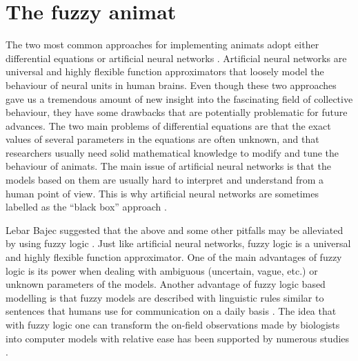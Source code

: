\section{The fuzzy animat}

The two most common approaches for implementing animats adopt either differential equations \cite{couzin2002collective,hildenbrandt2010selforganized,reynolds1987flocks,vicsek2012collective} or artificial neural networks \cite{kunz2006prey,witkowski2016emergence,zaera1996not}. Artificial neural networks \cite{mcculloch1943logical} are universal and highly flexible function approximators that loosely model the behaviour of neural units in human brains. Even though these two approaches gave us a tremendous amount of new insight into the fascinating field of collective behaviour, they have some drawbacks that are potentially problematic for future advances. The two main problems of differential equations are that the exact values of several parameters in the equations are often unknown, and that researchers usually need solid mathematical knowledge to modify and tune the behaviour of animats. The main issue of artificial neural networks is that the models based on them are usually hard to interpret and understand from a human point of view. This is why artificial neural networks are sometimes labelled as the ``black box'' approach \cite{paruelo1997prediction,lek1999artificial,ozesmi1999artificial}.

Lebar Bajec\etal \cite{lebarbajec2005fuzzy,lebarbajec2005simulating} suggested that the above and some other pitfalls may be alleviated by using fuzzy logic \cite{zadeh1965fuzzy}. Just like artificial neural networks, fuzzy logic is a universal and highly flexible function approximator. One of the main advantages of fuzzy logic is its power when dealing with ambiguous (uncertain, vague, etc.) or unknown parameters of the models. Another advantage of fuzzy logic based modelling is that fuzzy models are described with linguistic rules similar to sentences that humans use for communication on a daily basis \cite{kosko1994fuzzy,lebarbajec2005fuzzy,lebarbajec2005simulating,mamdani1974application,mamdani1975experiment,mendel2001uncertain,zadeh1965fuzzy}. The idea that with fuzzy logic one can transform the on-field observations made by biologists into computer models with relative ease has been supported by numerous studies \cite{dasilva2008predator,demsar2013family,demsar2014simulated,demsar2016balanced,demsar2017evolution,gras2009individualbasedevolving,lebarbajec2005fuzzy,lebarbajec2005simulating,mashayekhi2015individualbased,tron2004mathematical}.

